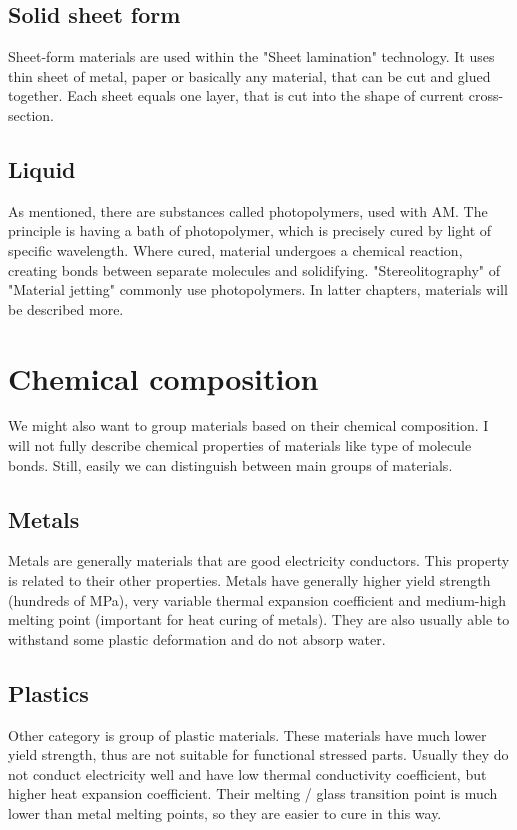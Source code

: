 \documentclass[a4paper, 11pt, reqno]{report}
\begin{document}
\subsection{Solid sheet form}
Sheet-form materials are used within the "Sheet lamination" technology. It uses thin sheet of metal, paper or basically any material, that can be cut and glued together. Each sheet equals one layer, that is cut into the shape of current cross-section.
\subsection{Liquid}
As mentioned, there are substances called photopolymers, used with AM. The principle is having a bath of photopolymer, which is precisely cured by light of specific wavelength. Where cured, material undergoes a chemical reaction, creating bonds between separate molecules and solidifying. "Stereolitography" of "Material jetting" commonly use photopolymers. In latter chapters, materials will be described more.\\
%
%
\section{Chemical composition}
We might also want to group materials based on their chemical composition. I will not fully describe chemical properties of materials like type of molecule bonds. Still, easily we can distinguish between main groups of materials.
\subsection{Metals}
Metals are generally materials that are good electricity conductors. This property is related to their other properties. Metals have generally higher yield strength (hundreds of MPa), very variable thermal expansion coefficient and medium-high melting point (important for heat curing of metals). They are also usually able to withstand some plastic deformation and do not absorp water.
\subsection{Plastics}
Other category is group of plastic materials. These materials have much lower yield strength, thus are not suitable for functional stressed parts. Usually they do not conduct electricity well and have low thermal conductivity coefficient, but higher heat expansion coefficient. Their melting / glass transition point is much lower than metal melting points, so they are easier to cure in this way.
\end{document}
